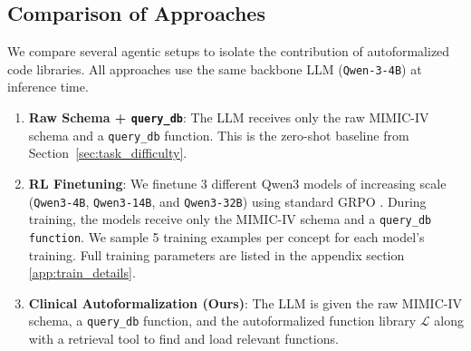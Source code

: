 \subsection{Comparison of Approaches}
\label{sec:baselines}

We compare several agentic setups to isolate the contribution of autoformalized code libraries.
All approaches use the same backbone LLM (\texttt{Qwen-3-4B}) at inference time.

\begin{enumerate}[label=\textbf{(\arabic*)},nosep,leftmargin=*]
    \item \textbf{Raw Schema + \texttt{query\_db}}: The LLM receives only the raw MIMIC-IV schema and a \texttt{query\_db} function. This is the zero-shot baseline from Section~\ref{sec:task_difficulty}.
    \item \textbf{RL Finetuning}: We finetune 3 different Qwen3 models of increasing scale (\texttt{Qwen3-4B}, \texttt{Qwen3-14B}, and \texttt{Qwen3-32B}) \cite{yang2025qwen3} using standard GRPO \cite{shao2024deepseekmath}. During training, the models receive only the MIMIC-IV schema and a \texttt{query\_db function}. We sample 5 training examples per concept for each model's training. Full training parameters are listed in the appendix section \ref{app:train_details}.
    \item \textbf{Clinical Autoformalization (Ours)}: The LLM is given the raw MIMIC-IV schema, a \texttt{query\_db} function, and the autoformalized function library $\mathcal{L}$ along with a retrieval tool to find and load relevant functions.
\end{enumerate}

